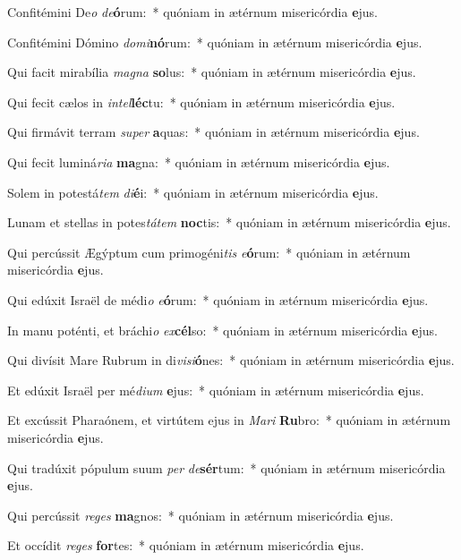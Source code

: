 \item Confitémini De\textit{o} \textit{de}\textbf{ó}rum:~* quóniam in ætérnum misericórdia \textbf{e}jus.
\item Confitémini Dómino \textit{do}\textit{mi}\textbf{nó}rum:~* quóniam in ætérnum misericórdia \textbf{e}jus.
\item Qui facit mirabília \textit{ma}\textit{gna} \textbf{so}lus:~* quóniam in ætérnum misericórdia \textbf{e}jus.
\item Qui fecit cælos in \textit{in}\textit{tel}\textbf{léc}tu:~* quóniam in ætérnum misericórdia \textbf{e}jus.
\item Qui firmávit terram \textit{su}\textit{per} \textbf{a}quas:~* quóniam in ætérnum misericórdia \textbf{e}jus.
\item Qui fecit luminá\textit{ri}\textit{a} \textbf{ma}gna:~* quóniam in ætérnum misericórdia \textbf{e}jus.
\item Solem in potestá\textit{tem} \textit{di}\textbf{é}i:~* quóniam in ætérnum misericórdia \textbf{e}jus.
\item Lunam et stellas in potes\textit{tá}\textit{tem} \textbf{noc}tis:~* quóniam in ætérnum misericórdia \textbf{e}jus.
\item Qui percússit Ægýptum cum primogéni\textit{tis} \textit{e}\textbf{ó}rum:~* quóniam in ætérnum misericórdia \textbf{e}jus.
\item Qui edúxit Israël de médi\textit{o} \textit{e}\textbf{ó}rum:~* quóniam in ætérnum misericórdia \textbf{e}jus.
\item In manu poténti, et bráchi\textit{o} \textit{ex}\textbf{cél}so:~* quóniam in ætérnum misericórdia \textbf{e}jus.
\item Qui divísit Mare Rubrum in di\textit{vi}\textit{si}\textbf{ó}nes:~* quóniam in ætérnum misericórdia \textbf{e}jus.
\item Et edúxit Israël per mé\textit{di}\textit{um} \textbf{e}jus:~* quóniam in ætérnum misericórdia \textbf{e}jus.
\item Et excússit Pharaónem, et virtútem ejus in \textit{Ma}\textit{ri} \textbf{Ru}bro:~* quóniam in ætérnum misericórdia \textbf{e}jus.
\item Qui tradúxit pópulum suum \textit{per} \textit{de}\textbf{sér}tum:~* quóniam in ætérnum misericórdia \textbf{e}jus.
\item Qui percússit \textit{re}\textit{ges} \textbf{ma}gnos:~* quóniam in ætérnum misericórdia \textbf{e}jus.
\item Et occídit \textit{re}\textit{ges} \textbf{for}tes:~* quóniam in ætérnum misericórdia \textbf{e}jus.
